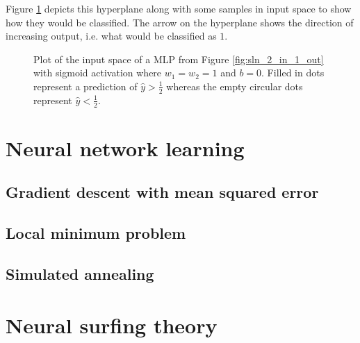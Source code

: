 \begin{example}
    Figure \ref{fig:sigmoid_hyperplane} depicts this hyperplane along with some samples in input space to show how they would be classified. 
    The arrow on the hyperplane shows the direction of increasing output, i.e. what would be classified as $1$.
    \begin{figure}
        \centering
        \caption{Plot of the input space of a MLP from Figure \ref{fig:sln_2_in_1_out} with sigmoid activation where $w_1=w_2=1$ and $b=0$. Filled in dots represent a prediction of $\hat{y}>\frac{1}{2}$ whereas the empty circular dots represent $\hat{y}<\frac{1}{2}$.}
        \label{fig:sigmoid_hyperplane}
    \end{figure}
\end{example}

\chapter{Neural network learning}
\section{Gradient descent with mean squared error}
\section{Local minimum problem}
\section{Simulated annealing}

\chapter{Neural surfing theory}

